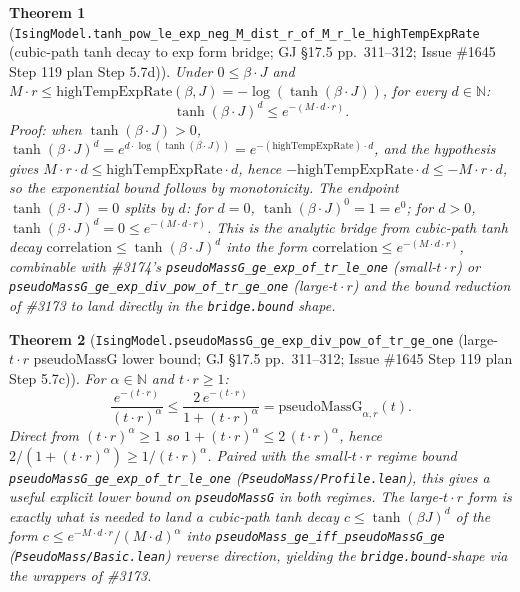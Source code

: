 \documentclass[a4paper,11pt]{article}
\newtheorem{theorem}{Theorem}
\begin{document}
\begin{theorem}[\texttt{IsingModel.tanh\_pow\_le\_exp\_neg\_M\_dist\_r\_of\_M\_r\_le\_highTempExpRate}
(cubic-path tanh decay to exp form bridge;
GJ \S17.5 pp.~311--312; Issue \#1645 Step 119 plan Step 5.7d)]
Under $0 \le \beta\cdot J$ and $M\cdot r \le \mathrm{highTempExpRate}(\beta, J)
= -\log(\tanh(\beta\cdot J))$, for every $d \in \mathbb{N}$:
\[
  \tanh(\beta\cdot J)^d \le e^{-(M\cdot d\cdot r)}.
\]
Proof: when $\tanh(\beta\cdot J) > 0$,
$\tanh(\beta\cdot J)^d = e^{d\cdot \log(\tanh(\beta\cdot J))}
= e^{-(\mathrm{highTempExpRate})\cdot d}$,
and the hypothesis gives $M\cdot r \cdot d \le \mathrm{highTempExpRate}\cdot d$, hence
$-\mathrm{highTempExpRate}\cdot d \le -M\cdot r \cdot d$, so the exponential bound
follows by monotonicity. The endpoint $\tanh(\beta\cdot J) = 0$ splits by $d$:
for $d = 0$, $\tanh(\beta\cdot J)^0 = 1 = e^{0}$; for $d > 0$,
$\tanh(\beta\cdot J)^d = 0 \le e^{-(M\cdot d\cdot r)}$. This is the analytic bridge
from cubic-path tanh decay $\mathrm{correlation} \le \tanh(\beta\cdot J)^d$ into
the form $\mathrm{correlation} \le e^{-(M\cdot d\cdot r)}$, combinable with
\#3174's \texttt{pseudoMassG\_ge\_exp\_of\_tr\_le\_one}
(small-$t\cdot r$) or \texttt{pseudoMassG\_ge\_exp\_div\_pow\_of\_tr\_ge\_one}
(large-$t\cdot r$) and the bound reduction of \#3173 to land directly in the
\texttt{bridge.bound} shape.
\end{theorem}

\begin{theorem}[\texttt{IsingModel.pseudoMassG\_ge\_exp\_div\_pow\_of\_tr\_ge\_one}
(large-$t\cdot r$ pseudoMassG lower bound;
GJ \S17.5 pp.~311--312; Issue \#1645 Step 119 plan Step 5.7c)]
For $\alpha \in \mathbb{N}$ and $t\cdot r \ge 1$:
\[
  \frac{e^{-(t\cdot r)}}{(t\cdot r)^\alpha} \le
  \frac{2\,e^{-(t\cdot r)}}{1 + (t\cdot r)^\alpha}
  = \mathrm{pseudoMassG}_{\alpha, r}(t).
\]
Direct from $(t\cdot r)^\alpha \ge 1$ so $1 + (t\cdot r)^\alpha \le 2\,(t\cdot r)^\alpha$,
hence $2 / (1 + (t\cdot r)^\alpha) \ge 1 / (t\cdot r)^\alpha$. Paired with the
small-$t\cdot r$ regime bound \texttt{pseudoMassG\_ge\_exp\_of\_tr\_le\_one}
(\texttt{PseudoMass/Profile.lean}), this gives a useful explicit lower bound on
\texttt{pseudoMassG} in both regimes. The large-$t\cdot r$ form is exactly what
is needed to land a cubic-path tanh decay $c \le \tanh(\beta J)^d$ of the form
$c \le e^{-M\cdot d\cdot r}/(M\cdot d)^\alpha$ into
\texttt{pseudoMass\_ge\_iff\_pseudoMassG\_ge} (\texttt{PseudoMass/Basic.lean})
reverse direction, yielding the \texttt{bridge.bound}-shape via the wrappers of
\#3173.
\end{theorem}
\end{document}
